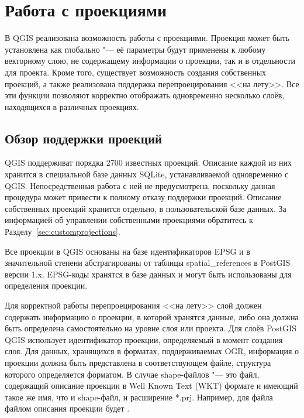 
\chapter{Работа с проекциями}\label{label_projections}


В QGIS реализована возможность работы с проекциями. Проекция может быть
установлена как глобально "--- её параметры будут применены к любому
векторному слою, не содержащему информации о проекции, так и в
отдельности для проекта. Кроме того, существует возможность создания
собственных проекций, а также реализована поддержка перепроецирования <<на
лету>>. Все эти функции позволяют корректно отображать одновременно несколько
слоёв, находящихся в различных проекциях.

\section{Обзор поддержки проекций}\label{label_projoverview}

QGIS поддерживат порядка 2700 известных проекций. Описание каждой из них
хранится в специальной базе данных SQLite, устанавливаемой одновременно
с QGIS. Непосредственная работа с ней не предусмотрена, поскольку данная
процедура может привести к полному отказу поддержки проекций. Описание
собственных проекций хранится отдельно, в пользовательской базе данных.
За информацией об управлении собственными проекциями обратитесь к
Разделу~\ref{sec:customprojections}.

Все проекции в QGIS основаны на базе идентификаторов EPSG и
в значительной степени абстрагированы от таблицы spatial\_references в
PostGIS версии 1.x. EPSG-коды хранятся в базе данных и
могут быть использованы для определения проекции.

Для корректной работы перепроецирования <<на лету>> слой должен содержать
информацию о проекции, в которой хранятся данные, либо она должна быть
определена самостоятельно на уровне слоя или проекта. Для слоёв PostGIS
QGIS использует идентификатор проекции, определяемый в момент создания
слоя. Для данных, хранящихся в форматах, поддерживаемых OGR, информация
о проекции должна быть представлена в соответствующем файле, структура которого
определяется форматом. В случае shape-файлов "--- это файл, содержащий описание
проекции в Well Known Text (WKT) формате и имеющий такое же имя,
что и shape-файл, и расширение *.prj. Например, для файла 
файлом описания проекции будет .

